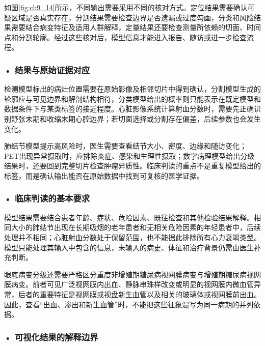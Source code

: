 如图\ref{fig:ch9_14}所示，不同输出需要采用不同的核对方式。定位结果需要确认可疑区域是否真实存在，分割结果需要检查边界是否遗漏或过度勾画，分类和风险结果需要结合病变特征及适用人群解释，定量结果还要检查测量所依赖的切面、时间点和分割轮廓。经过这些核对后，模型信息才能进入报告、随访或进一步检查流程。

\par
\noindent\begin{minipage}{\textwidth}
\centering
{}
\label{fig:ch9_14}
\end{minipage}
\par

\subsubsection*{\textbf{• 结果与原始证据对应}}

检测模型标出的病灶位置需要在原始影像及相邻切片中得到确认，分割模型生成的轮廓应与可见边界和解剖结构相符，分类模型给出的概率则只能表示在既定模型和数据条件下与某类标签的接近程度。心脏影像系统计算射血分数时，需要先正确识别舒张末期和收缩末期心腔边界；若切面选择或分割存在偏差，后续参数也会发生变化。

肺结节模型提示高风险时，医生需要查看结节大小、密度、边缘和随访变化；PET出现异常摄取时，应排除炎症、感染和生理性摄取；数字病理模型给出分级结果时，还要回到完整切片检查肿瘤异质性。临床判读的重点不是重复模型给出的标签，而是确认输出能否在原始数据中找到可复核的医学证据。

\subsubsection*{\textbf{• 临床判读的基本要求}}

模型结果需要结合患者年龄、症状、危险因素、既往检查和其他检验结果解释。相同大小的肺结节出现在长期吸烟的老年患者和无相关危险因素的年轻患者中，后续处理并不相同；心脏射血分数处于保留范围，也不能据此排除所有心力衰竭类型。模型只能处理其输入中包含的信息，未输入的病史、体征和治疗背景仍需由医生补充判断。

眼底病变分级还需要严格区分重度非增殖期糖尿病视网膜病变与增殖期糖尿病视网膜病变。前者可见广泛视网膜内出血、静脉串珠样改变或明显的视网膜内微血管异常，后者的重要特征是视网膜或视盘新生血管以及相关的玻璃体或视网膜前出血。因此，查看“出血、渗出和新生血管”时，不能把这些征象混写为同一病期的并列依据。

\subsubsection*{\textbf{• 可视化结果的解释边界}}

